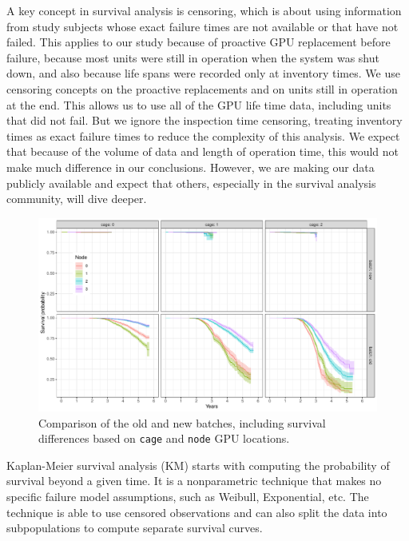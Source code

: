 A key concept in survival analysis is censoring, which is about using
information from study subjects whose exact failure times are not
available or that have not failed. This applies to our study because
of proactive GPU replacement before failure, because most units were
still in operation when the system was shut down, and also because
life spans were recorded only at inventory times. We use censoring
concepts on the proactive replacements and on units still in operation at
the end. This allows us to use all of the GPU life time data,
including units that did not fail. But we ignore the inspection time
censoring, treating inventory times as exact failure times to reduce
the complexity of this analysis. We expect that because of the volume
of data and length of operation time, this would not make much
difference in our conclusions. However, we are making our data
publicly available and expect that others, especially in the survival
analysis community, will dive deeper.
\begin{figure}
  \centering
  \includegraphics[width=7in]{figs/km_cage-node_a001.pdf}
  \caption{Comparison of the old and new batches, including survival
    differences based on {\tt cage} and {\tt node} GPU locations.}
  \label{fig:km-all-cage-node}
\end{figure}

Kaplan-Meier survival analysis (KM)
 starts with computing the
probability of survival beyond a given time. It is a nonparametric
technique that makes no specific failure model assumptions, such as
Weibull, Exponential, etc. The technique is able to use censored
observations and can also split the data into subpopulations to
compute separate survival curves.

